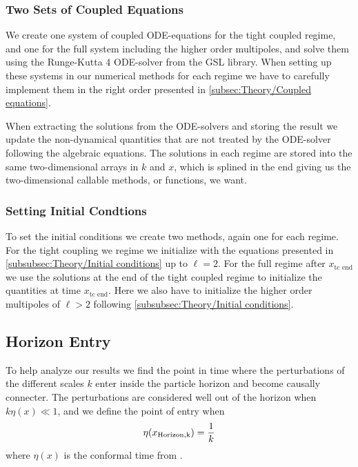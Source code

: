 \documentclass[10pt,a4paper]{article}
\begin{document}
\subsubsection{Two Sets of Coupled Equations}
\label{subsubsec:Method/Two ODE systems}
We create one system of coupled ODE-equations for the tight coupled regime, and one for the full system including the higher order multipoles, and solve them using the Runge-Kutta 4 ODE-solver from the GSL library. When setting up these systems in our numerical methods for each regime we have to carefully implement them in the right order presented in \cref{subsec:Theory/Coupled equations}.

When extracting the solutions from the ODE-solvers and storing the result we update the non-dynamical quantities that are not treated by the ODE-solver following the algebraic equations. The solutions in each regime are stored into the same two-dimensional arrays in $k$ and $x$, which is splined in the end giving us the two-dimensional callable methods, or functions, we want.

\subsubsection{Setting Initial Condtions}
\label{subsubsec:Method/setting initial conditions}
To set the initial conditions we create two methods, again one for each regime. For the tight coupling we regime we initialize with the equations presented in \cref{subsubsec:Theory/Initial conditions} up to $\ell = 2$. For the full regime after $x_{\textrm{tc end}}$ we use the solutions at the end of the tight coupled regime to initialize the quantities at time $x_{\textrm{tc end}}$. Here we also have to initialize the higher order multipoles of $\ell > 2$ following \cref{subsubsec:Theory/Initial conditions}.

\subsection{Horizon Entry}
\label{subsec:Method/Horizon entry}
To help analyze our results we find the point in time where the perturbations of the different scales $k$ enter inside the particle horizon and become causally connecter. The perturbations are considered well out of the horizon when $k\eta(x) \ll 1$, and we define the point of entry when
\begin{equation}
  \eta(x_{\rm{Horizon,k}}) = \frac{1}{k}
  \label{eq:Horizon entry}
\end{equation}
where $\eta(x)$ is the conformal time from \cite{milestone1}.
\end{document}
